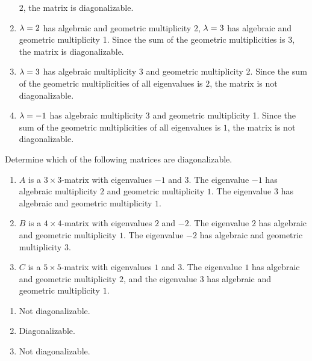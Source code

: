 \begin{ex}
\begin{sol}
\begin{enumerate}
      $2$, the matrix is diagonalizable.
    \item $\lambda=2$ has algebraic and geometric
      multiplicity 2, $\lambda=3$ has algebraic and geometric
      multiplicity 1. Since the sum of the geometric multiplicities is
      $3$, the matrix is diagonalizable.
    \item $\lambda=3$ has algebraic multiplicity 3 and geometric
      multiplicity 2. Since the sum of the geometric multiplicities of
      all eigenvalues is $2$, the matrix is not diagonalizable.
    \item $\lambda = -1$ has algebraic multiplicity 3 and geometric
      multiplicity 1. Since the sum of the geometric multiplicities of
      all eigenvalues is $1$, the matrix is not diagonalizable.
    \end{enumerate}
  \end{sol}
\end{ex}

\begin{ex}
  Determine which of the following matrices are diagonalizable.
  \begin{enumerate}
  \item $A$ is a $3\times 3$-matrix with eigenvalues $-1$ and $3$. The
    eigenvalue $-1$ has algebraic multiplicity $2$ and geometric
    multiplicity $1$. The eigenvalue $3$ has algebraic and geometric
    multiplicity $1$.
  \item $B$ is a $4\times 4$-matrix with eigenvalues $2$ and $-2$. The
    eigenvalue $2$ has algebraic and geometric multiplicity $1$. The
    eigenvalue $-2$ has algebraic and geometric multiplicity $3$.
  \item $C$ is a $5\times 5$-matrix with eigenvalues $1$ and $3$. The
    eigenvalue $1$ has algebraic and geometric multiplicity $2$, and
    the eigenvalue $3$ has algebraic and geometric multiplicity $1$.
  \end{enumerate}
  \begin{sol}
    \begin{enumerate}
    \item Not diagonalizable.
    \item Diagonalizable.
    \item Not diagonalizable.
    \end{enumerate}
  \end{sol}
\end{ex}

